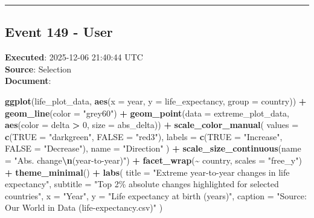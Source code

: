 \documentclass[
  11pt,
]{article}
\newenvironment{Shaded}{\begin{snugshade}}{\end{snugshade}}
\newcommand{\AttributeTok}[1]{\textcolor[rgb]{0.13,0.29,0.53}{#1}}
\newcommand{\DecValTok}[1]{\textcolor[rgb]{0.00,0.00,0.81}{#1}}
\newcommand{\FunctionTok}[1]{\textcolor[rgb]{0.13,0.29,0.53}{\textbf{#1}}}
\newcommand{\NormalTok}[1]{#1}
\newcommand{\OtherTok}[1]{\textcolor[rgb]{0.56,0.35,0.01}{#1}}
\newcommand{\SpecialCharTok}[1]{\textcolor[rgb]{0.81,0.36,0.00}{\textbf{#1}}}
\newcommand{\StringTok}[1]{\textcolor[rgb]{0.31,0.60,0.02}{#1}}
\begin{document}
\begin{center}\rule{0.5\linewidth}{0.5pt}\end{center}

\subsection{Event 149 - User}\label{event-149---user}

\textbf{Executed}: 2025-12-06 21:40:44 UTC\\
\textbf{Source}: Selection\\
\textbf{Document}:

\begin{Shaded}
\begin{Highlighting}[]
\FunctionTok{ggplot}\NormalTok{(life\_plot\_data, }\FunctionTok{aes}\NormalTok{(}\AttributeTok{x =}\NormalTok{ year, }\AttributeTok{y =}\NormalTok{ life\_expectancy, }\AttributeTok{group =}\NormalTok{ country)) }\SpecialCharTok{+}
  \FunctionTok{geom\_line}\NormalTok{(}\AttributeTok{color =} \StringTok{"grey60"}\NormalTok{) }\SpecialCharTok{+}
  \FunctionTok{geom\_point}\NormalTok{(}\AttributeTok{data =}\NormalTok{ extreme\_plot\_data,}
             \FunctionTok{aes}\NormalTok{(}\AttributeTok{color =}\NormalTok{ delta }\SpecialCharTok{\textgreater{}} \DecValTok{0}\NormalTok{, }\AttributeTok{size =}\NormalTok{ abs\_delta)) }\SpecialCharTok{+}
  \FunctionTok{scale\_color\_manual}\NormalTok{(}
    \AttributeTok{values =} \FunctionTok{c}\NormalTok{(}\StringTok{\textasciigrave{}}\AttributeTok{TRUE}\StringTok{\textasciigrave{}} \OtherTok{=} \StringTok{"darkgreen"}\NormalTok{, }\StringTok{\textasciigrave{}}\AttributeTok{FALSE}\StringTok{\textasciigrave{}} \OtherTok{=} \StringTok{"red3"}\NormalTok{),}
    \AttributeTok{labels =} \FunctionTok{c}\NormalTok{(}\StringTok{\textasciigrave{}}\AttributeTok{TRUE}\StringTok{\textasciigrave{}} \OtherTok{=} \StringTok{"Increase"}\NormalTok{, }\StringTok{\textasciigrave{}}\AttributeTok{FALSE}\StringTok{\textasciigrave{}} \OtherTok{=} \StringTok{"Decrease"}\NormalTok{),}
    \AttributeTok{name =} \StringTok{"Direction"}
\NormalTok{  ) }\SpecialCharTok{+}
  \FunctionTok{scale\_size\_continuous}\NormalTok{(}\AttributeTok{name =} \StringTok{"Abs. change}\SpecialCharTok{\textbackslash{}n}\StringTok{(year{-}to{-}year)"}\NormalTok{) }\SpecialCharTok{+}
  \FunctionTok{facet\_wrap}\NormalTok{(}\SpecialCharTok{\textasciitilde{}}\NormalTok{ country, }\AttributeTok{scales =} \StringTok{"free\_y"}\NormalTok{) }\SpecialCharTok{+}
  \FunctionTok{theme\_minimal}\NormalTok{() }\SpecialCharTok{+}
  \FunctionTok{labs}\NormalTok{(}
    \AttributeTok{title =} \StringTok{"Extreme year{-}to{-}year changes in life expectancy"}\NormalTok{,}
    \AttributeTok{subtitle =} \StringTok{"Top 2\% absolute changes highlighted for selected countries"}\NormalTok{,}
    \AttributeTok{x =} \StringTok{"Year"}\NormalTok{,}
    \AttributeTok{y =} \StringTok{"Life expectancy at birth (years)"}\NormalTok{,}
    \AttributeTok{caption =} \StringTok{"Source: Our World in Data (life{-}expectancy.csv)"}
\NormalTok{  )}
\end{Highlighting}
\end{Shaded}
\end{document}
